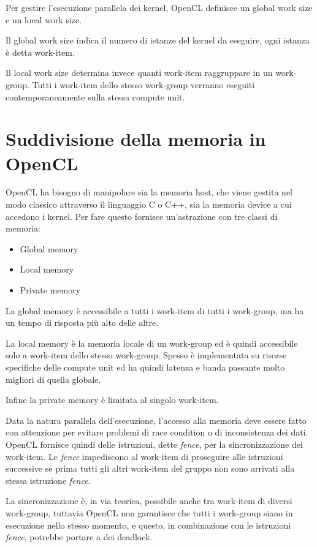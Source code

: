 Per gestire l'esecuzione parallela dei kernel, OpenCL definisce un global work size e un local work size.

Il global work size indica il numero di istanze del kernel da eseguire, ogni istanza è detta work-item.

Il local work size determina invece quanti work-item raggruppare in un work-group. Tutti i work-item dello stesso work-group verranno eseguiti contemporaneamente sulla stessa compute unit.

\section{Suddivisione della memoria in OpenCL}

OpenCL ha bisogno di manipolare sia la memoria host, che viene gestita nel modo classico attraverso il linguaggio C o C++, sia la memoria device a cui accedono i kernel. 
Per fare questo fornisce un'astrazione con tre classi di memoria:

\begin{itemize}
	\item Global memory
	\item Local memory
	\item Private memory
\end{itemize}

La global memory è accessibile a tutti i work-item di tutti i work-group, ma ha un tempo di risposta più alto delle altre.

La local memory è la memoria locale di un work-group ed è quindi accessibile solo a work-item dello stesso work-group. Spesso è implementata su risorse specifiche delle compute unit ed ha quindi latenza e banda passante molto migliori di quella globale.

Infine la private memory è limitata al singolo work-item.

Data la natura parallela dell'esecuzione, l'accesso alla memoria deve essere fatto con attenzione per evitare problemi di race condition o di inconsistenza dei dati.
OpenCL fornisce quindi delle istruzioni, dette \textit{fence}, per la sincronizzazione dei work-item. Le \textit{fence} impediscono al work-item di proseguire alle istruzioni successive se prima tutti gli altri work-item del gruppo non sono arrivati alla stessa istruzione \textit{fence}.

La sincronizzazione è, in via teorica, possibile anche tra work-item di diversi work-group, tuttavia OpenCL non garantisce che tutti i work-group siano in esecuzione nello stesso momento, e questo, in combinazione con le istruzioni \textit{fence}, potrebbe portare a dei deadlock.

